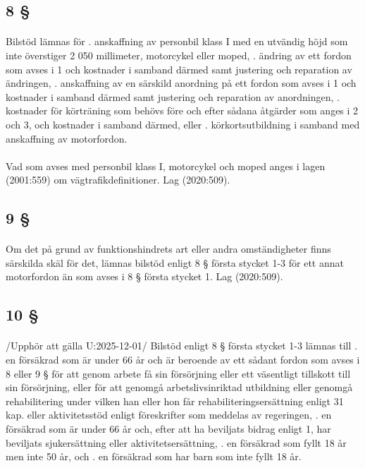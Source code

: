 \documentclass[a4paper,notitlepage,openany,10pt]{book}
\begin{document}
\subsection*{8 §}
\paragraph*{}
Bilstöd lämnas för
. anskaffning av personbil klass I med en utvändig höjd som inte överstiger 2 050 millimeter, motorcykel eller moped,
. ändring av ett fordon som avses i 1 och kostnader i samband därmed samt justering och reparation av ändringen,
. anskaffning av en särskild anordning på ett fordon som avses i 1 och kostnader i samband därmed samt justering och reparation av anordningen,
. kostnader för körträning som behövs före och efter sådana åtgärder som anges i 2 och 3, och kostnader i samband därmed, eller
. körkortsutbildning i samband med anskaffning av motorfordon.
\paragraph*{}
Vad som avses med personbil klass I, motorcykel och moped anges i lagen (2001:559) om vägtrafikdefinitioner.
Lag (2020:509).
\subsection*{9 §}
\paragraph*{}
Om det på grund av funktionshindrets art eller andra omständigheter finns särskilda skäl för det, lämnas bilstöd enligt 8 § första stycket 1-3 för ett annat motorfordon än som avses i 8 § första stycket 1.
Lag (2020:509).
\subsection*{10 §}
\paragraph*{}
/Upphör att gälla U:2025-12-01/
Bilstöd enligt 8 § första stycket 1-3 lämnas till
. en försäkrad som är under 66 år och är beroende av ett sådant fordon som avses i 8 eller 9 § för att genom arbete få sin försörjning eller ett väsentligt tillskott till sin försörjning, eller för att genomgå arbetslivsinriktad utbildning eller genomgå rehabilitering under vilken han eller hon får rehabiliteringsersättning enligt 31 kap. eller aktivitetsstöd enligt föreskrifter som meddelas av regeringen,
. en försäkrad som är under 66 år och, efter att ha beviljats bidrag enligt 1, har beviljats sjukersättning eller aktivitetsersättning,
. en försäkrad som fyllt 18 år men inte 50 år, och
. en försäkrad som har barn som inte fyllt 18 år.
\end{document}
